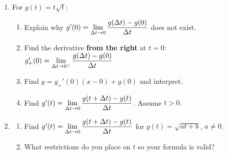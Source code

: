\begin{enumerate}
\setcounter{enumi}{\value{HW}}

\item  For  $g(t) = t \sqrt{t}$:

\begin{enumerate}

\item  Explain why $g'(0) = \displaystyle{\lim_{\Delta t \rightarrow 0} \dfrac{g(\Delta t) - g(0)}{\Delta t}}$ does not exist.

\item Find the  derivative \textbf{from the right} at $t=0$:  $g_{+}'(0) = \displaystyle{\lim_{\Delta t \rightarrow 0^{+}} \dfrac{g(\Delta t) - g(0)}{\Delta t}}$

\item  Find $y = g_{+}'(0) (x-0) + g(0)$ and interpret.

\item Find  $g'(t) =  \displaystyle{\lim_{\Delta t \rightarrow 0} \dfrac{g(t+\Delta t) - g(t)}{\Delta t}}$.  Assume $t>0$.

\end{enumerate}


\item  \begin{enumerate} \item Find  $g'(t) =  \displaystyle{\lim_{\Delta t \rightarrow 0} \dfrac{g(t+\Delta t) - g(t)}{\Delta t}}$ for  $g(t) = \sqrt{at+b}$, $a \neq 0$. 

\smallskip

\item What restrictions do you place on $t$ so your formula is valid?

\end{enumerate}


\setcounter{HW}{\value{enumi}}
\end{enumerate}


